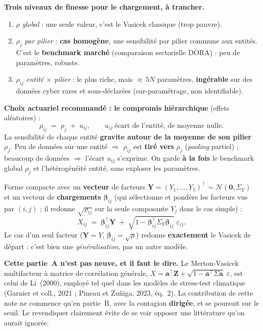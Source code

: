 \documentclass[11pt,a4paper]{article}
\newcommand{\Y}{Y}
\newcommand{\eps}{\varepsilon}
\begin{document}
\begin{attention}
\textbf{Trois niveaux de finesse pour le chargement, à trancher.}
\begin{enumerate}[leftmargin=1.5em,itemsep=1pt,topsep=2pt]
\item $\rho$ \emph{global} : une seule valeur, c'est le Vasicek classique (trop pauvre).
\item $\rho_j$ \emph{par pilier} : \textbf{cas homogène}, une sensibilité par pilier commune
  aux entités. C'est le \textbf{benchmark marché} (comparaison sectorielle DORA) : peu de
  paramètres, robuste.
\item $\rho_{ij}$ \emph{entité $\times$ pilier} : le plus riche, mais ${\approx}\,5N$
  paramètres, \textbf{ingérable} sur des données cyber rares et sous-déclarées
  (sur-paramétrage, non identifiable).
\end{enumerate}
\textbf{Choix actuariel recommandé : le compromis hiérarchique} (effets aléatoires) :
\[
\rho_{ij} \;=\; \rho_j \;+\; u_{ij}, \qquad u_{ij}\ \text{écart de l'entité, de moyenne nulle}.
\]
La sensibilité de chaque entité \textbf{gravite autour de la moyenne de son pilier} $\rho_j$.
Peu de données sur une entité $\Rightarrow$ $\rho_{ij}$ est \textbf{tiré vers} $\rho_j$
(\emph{pooling} partiel) ; beaucoup de données $\Rightarrow$ l'écart $u_{ij}$ s'exprime. On
garde \textbf{à la fois} le benchmark global $\rho_j$ et l'hétérogénéité entité, sans exploser
les paramètres.
\end{attention}

\noindent Forme compacte avec un \textbf{vecteur} de facteurs
$\mathbf Y = (\Y_1,\dots,\Y_5)^\top \sim \mathcal N(\mathbf 0,\Sigma_Y)$ et un vecteur de
\textbf{chargements} $\boldsymbol\beta_{ij}$ (qui sélectionne et pondère les facteurs vus par
$(i,j)$ ; il redonne $\sqrt{\rho_{ij}}$ sur la seule composante $\Y_j$ dans le cas simple) :
\begin{equation}
X_{ij} \;=\; \boldsymbol\beta_{ij}^\top \mathbf Y \;+\; \sqrt{1-\boldsymbol\beta_{ij}^\top\Sigma_Y\boldsymbol\beta_{ij}}\;\eps_{ij}.
\end{equation}
Le cas d'un seul facteur ($\mathbf Y = \Y$, $\boldsymbol\beta_{ij}=\sqrt\rho$) redonne
\textbf{exactement} le Vasicek de départ : c'est bien une \emph{généralisation}, pas un autre
modèle.

\begin{cle}
\textbf{Cette partie~A n'est pas neuve, et il faut le dire.} Le Merton-Vasicek multifacteur
à matrice de corrélation générale, $X = \mathbf a^\top \mathbf Z + \sqrt{1 - \mathbf a^\top
\Sigma \mathbf a}\;\eps$, est celui de Li~(2000), employé tel quel dans les modèles de
stress-test climatique (Garnier et coll., 2021 ; Pineau et Zu\~niga, 2023, éq.~2). La
contribution de cette note ne commence qu'en partie~B, avec la contagion \textbf{dirigée},
et se poursuit sur le seuil. Le revendiquer clairement évite de se voir opposer une
littérature qu'on aurait ignorée.
\end{cle}
\end{document}
